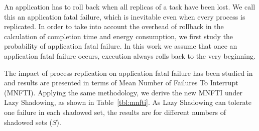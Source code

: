 An application has to roll back when all replicas of a task have been lost. We call this an application fatal failure, which is inevitable even when every process is replicated. 
In order to take into account the overhead of rollback in the calculation of completion time and energy consumption, we first 
study the probability of application fatal failure. In this work we assume that once an application fatal failure occurs, execution always rolls back to the very 
beginning. 

The impact of process replication on application fatal failure has been studied in~\cite{casanova_inria_2012} and 
results are presented in terms of Mean Number of Failures To Interrupt (MNFTI). %
Applying the same methodology, we derive the new MNFTI
under Lazy Shadowing, %
as shown in Table~\ref{tbl:mnfti}. As Lazy Shadowing can tolerate one failure in each shadowed set, the results are 
for different numbers of shadowed sets ($S$). 
